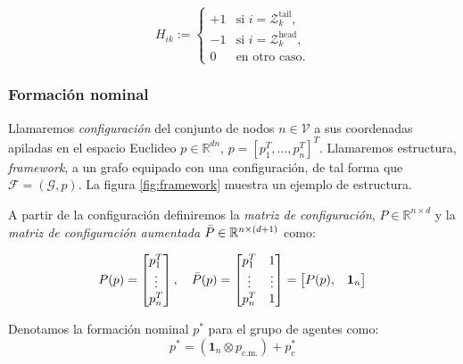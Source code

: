 \documentclass[11pt, a4paper]{article} %
\begin{document}
\begin{equation}
H_{ik} :=
\begin{cases} 
+1 & \text{si } i = \mathcal{Z}_{k}^{\text{tail}}, \\ 
-1 & \text{si } i = \mathcal{Z}_{k}^{\text{head}}, \\ 
0 & \text{en otro caso}.
\end{cases}
\end{equation}

\subsubsection{Formación nominal}
Llamaremos \textit{configuración} del conjunto de nodos $n\in\mathcal{V}$ a sus coordenadas apiladas en el espacio Euclideo $p\in\mathbb{R}^{dn}$, $p = [p_1^T,\dots, p_n^T]^T$. Llamaremos estructura, \textit{framework}, a un grafo equipado con una configuración, de tal forma que $\mathcal{F}=(\mathcal{G}, p)$. La figura \ref{fig:framework} muestra un ejemplo de estructura.

A partir de la configuración definiremos la \textit{matriz de configuración}, $P\in\mathbb{R}^{n\times d}$ y la \textit{matriz de configuración aumentada} $\Bar{P}\in\mathbb{R}^{n\times (d+1)}$ como:

\begin{equation}
P(p) = 
\begin{bmatrix}
p_1^T \\
\vdots \\
p_n^T
\end{bmatrix},
\quad
\Bar{P}(p) = 
\begin{bmatrix}
p_1^T & 1 \\
\vdots & \vdots \\
p_n^T & 1
\end{bmatrix}
= \begin{bmatrix}
P(p), & \boldsymbol{1}_n
\end{bmatrix}
\end{equation}

Denotamos la formación nominal $p^*$ para el grupo de agentes como:
\begin{equation}
    p^* = (\boldsymbol{1}_n \otimes p_\text{c.m.}) + p^*_c
\end{equation}
\end{document}
